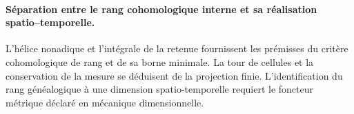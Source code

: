 \paragraph{Séparation entre le rang cohomologique interne et sa réalisation spatio--temporelle.}
L'hélice nonadique et l'intégrale de la retenue fournissent les prémisses du
critère cohomologique de rang et de sa borne minimale. La tour de cellules et la
conservation de la mesure se déduisent de la projection finie. L'identification
du rang généalogique à une dimension spatio-temporelle requiert le foncteur
métrique déclaré en mécanique dimensionnelle.
